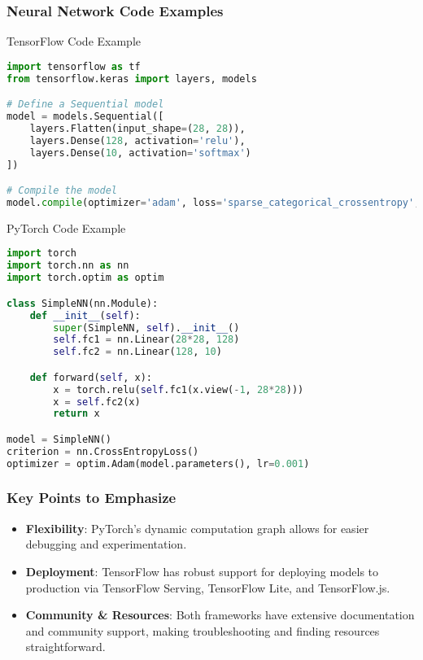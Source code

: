 \documentclass{beamer}
\begin{document}
\begin{frame}[fragile]
    \frametitle{Neural Network Code Examples}
    \begin{block}{TensorFlow Code Example}
    \begin{lstlisting}[language=python]
import tensorflow as tf
from tensorflow.keras import layers, models

# Define a Sequential model
model = models.Sequential([
    layers.Flatten(input_shape=(28, 28)),
    layers.Dense(128, activation='relu'),
    layers.Dense(10, activation='softmax')
])

# Compile the model
model.compile(optimizer='adam', loss='sparse_categorical_crossentropy', metrics=['accuracy'])
    \end{lstlisting}
    \end{block}
    
    \begin{block}{PyTorch Code Example}
    \begin{lstlisting}[language=python]
import torch
import torch.nn as nn
import torch.optim as optim

class SimpleNN(nn.Module):
    def __init__(self):
        super(SimpleNN, self).__init__()
        self.fc1 = nn.Linear(28*28, 128)
        self.fc2 = nn.Linear(128, 10)

    def forward(self, x):
        x = torch.relu(self.fc1(x.view(-1, 28*28)))
        x = self.fc2(x)
        return x

model = SimpleNN()
criterion = nn.CrossEntropyLoss()
optimizer = optim.Adam(model.parameters(), lr=0.001)
    \end{lstlisting}
    \end{block}
\end{frame}

\begin{frame}
    \frametitle{Key Points to Emphasize}
    \begin{itemize}
        \item \textbf{Flexibility}: PyTorch's dynamic computation graph allows for easier debugging and experimentation.
        \item \textbf{Deployment}: TensorFlow has robust support for deploying models to production via TensorFlow Serving, TensorFlow Lite, and TensorFlow.js.
        \item \textbf{Community \& Resources}: Both frameworks have extensive documentation and community support, making troubleshooting and finding resources straightforward.
    \end{itemize}
\end{frame}
\end{document}
